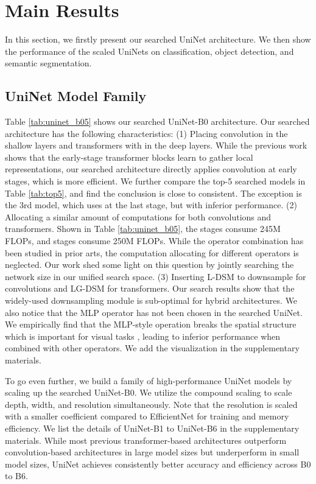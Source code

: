 \documentclass[runningheads]{llncs}
\begin{document}
\section{Main Results}
\label{main_results}

In this section, we firstly present our searched UniNet architecture. We then show the performance of the scaled UniNets on classification, object detection, and semantic segmentation.


\subsection{UniNet Model Family}
Table \ref{tab:uninet_b05} shows our searched UniNet-B0 architecture. Our searched architecture has the following characteristics: (1) Placing convolution in the shallow layers and transformers with  in the deep layers. While the previous work \cite{vit} shows that the early-stage transformer blocks learn to gather local representations, our searched architecture directly applies convolution at early stages, which is more efficient. We further compare the top-5 searched models in Table \ref{tab:top5}, and find the conclusion is close to consistent. The exception is the 3rd model, which uses  at the last stage, but with inferior performance. 
(2) Allocating a similar amount of computations for
both convolutions and transformers. Shown in Table \ref{tab:uninet_b05}, the  stages consume 245M FLOPs, and  stages consume 250M FLOPs. While the operator combination has been studied in prior arts, the computation allocating for different operators is neglected. Our work shed some light on this question by jointly searching the network size in our unified search space.
(3) Inserting L-DSM to downsample for convolutions and LG-DSM for transformers. Our search results show that the widely-used downsampling module is sub-optimal for hybrid architectures. We also notice that the MLP operator has not been chosen in the searched UniNet. We empirically find that the MLP-style operation breaks the spatial structure which is important for visual tasks \cite{islam2020much}, leading to inferior performance when combined with other operators. We add the visualization in the supplementary materials. 


To go even further, we build a family of high-performance UniNet models by scaling up the searched UniNet-B0. We utilize the compound scaling \cite{efficientnet} to scale depth, width, and resolution simultaneously. Note that the resolution is scaled with a smaller coefficient compared to EfficientNet \cite{efficientnet} for training and memory efficiency. We list the details of UniNet-B1 to UniNet-B6 in the supplementary materials.
While most previous transformer-based architectures outperform convolution-based architectures in large model sizes but underperform in small model sizes, UniNet achieves consistently better accuracy and efficiency across B0 to B6.
\end{document}
